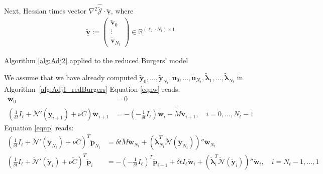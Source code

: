 Next, Hessian times vector $\nabla^2 \hat{\tilde{\mathcal J}} \cdot \mathbf{\underline{\tilde{v}}}$, where
\begin{align}
\label{bigv_red}
\mathbf{\underline{\tilde{v}}} := \begin{pmatrix} \mathbf{\tilde{v}}_0 \\ \vdots \\ \mathbf{\tilde{v}}_{N_t} \end{pmatrix} \in \mathbb{R}^{(\ell_2 \cdot N_t) \times 1}
\end{align}
\begin{algorithm}[H]
\caption{Algorithm \ref{alg:Adj2} applied to the reduced Burgers' model}
\label{alg:Adj2_redBurgers}
\begin{algorithmic}[1]
\STATE We assume that we have already computed $\mathbf{\tilde{y}}_0,...,\mathbf{\tilde{y}}_{N_t}, \mathbf{\tilde{u}}_0,...,\mathbf{\tilde{u}}_{N_t},\boldsymbol{\tilde{\lambda}}_1,...,\boldsymbol{\tilde{\lambda}}_{N_t}$ in \mbox{Algorithm \ref{alg:Adj1_redBurgers}}
\STATE Equation \eqref{eqnw} reads:
\begin{subequations}
\begin{align}
\label{wRedOrder_init}
\mathbf{\tilde{w}}_0 &= 0 \\
\label{wRedOrder}
\left( \frac{1}{\delta \!t} I_\ell + \tilde{\mathcal{N}}'(\mathbf{\tilde{y}}_{i+1})  + \nu \tilde{C}\right) \mathbf{\tilde{w}}_{i+1} &=  - (-\frac{1}{\delta \! t}I_\ell)\mathbf{\tilde{w}}_i - \tilde{\tilde{M}}\mathbf{\tilde{v}}_{i+1} , \quad i = 0,...,N_t-1
\end{align}
\end{subequations}
\STATE Equation \eqref{eqnp} reads:
\begin{subequations}
\begin{align}
\label{pRedOrder_term}
\left( \frac{1}{\delta \!t} I_\ell + \tilde{\mathcal{N}}'(\mathbf{\tilde{y}}_{N_t})  + \nu \tilde{C} \right)^T \mathbf{\tilde{p}}_{N_t} &= \delta \! t \tilde{M} \mathbf{\tilde{w}}_{N_t} + \left( \tilde{\boldsymbol \lambda}_{N_t}^T \tilde{\mathcal{N}}(\mathbf{\tilde{y}}_{N_t}) \right)'' \mathbf{\tilde{w}}_{N_t} \\
\label{pRedOrder}
\left( \frac{1}{\delta \!t} I_\ell + \tilde{\mathcal{N}}'(\mathbf{\tilde{y}}_{i})  + \nu \tilde{C} \right)^T \mathbf{\tilde{p}}_{i} &=  -(-\frac{1}{\delta \! t}I_\ell)^T\mathbf{\tilde{p}}_{i+1} + \delta \! t I_\ell \mathbf{\tilde{w}}_i + \left( \tilde{\boldsymbol \lambda}_{i}^T \tilde{\mathcal{N}}(\mathbf{\tilde{y}}_{i}) \right)'' \mathbf{\tilde{w}}_{i}, \quad i = N_t-1,...,1

\end{align}
\end{subequations}
\end{algorithmic}
\end{algorithm}
